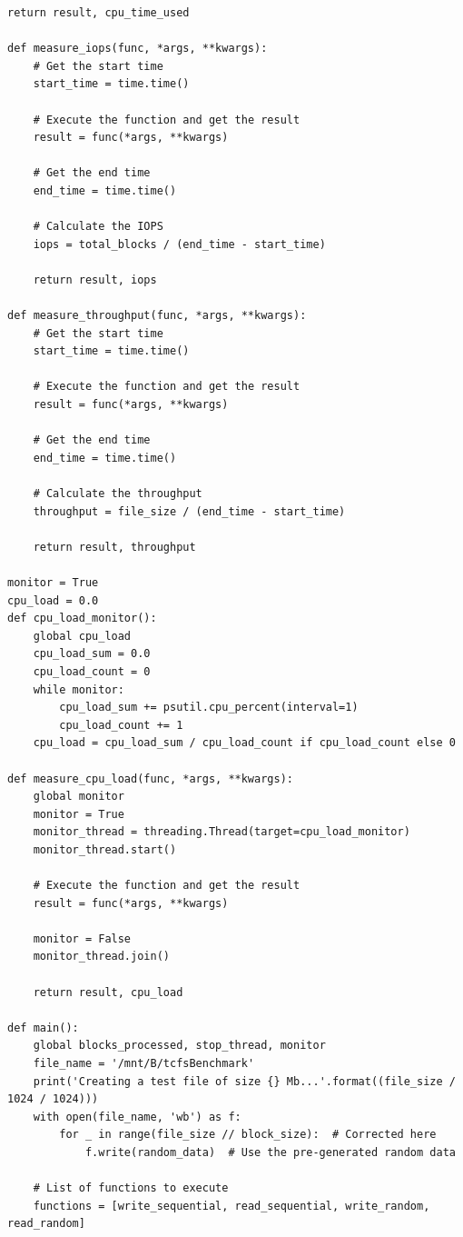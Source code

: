 \begin{lstlisting}[style=Python, caption=Script Python per il benchmarking, label=python-benchmark.py]
    return result, cpu_time_used

def measure_iops(func, *args, **kwargs):
    # Get the start time
    start_time = time.time()

    # Execute the function and get the result
    result = func(*args, **kwargs)

    # Get the end time
    end_time = time.time()

    # Calculate the IOPS
    iops = total_blocks / (end_time - start_time)

    return result, iops

def measure_throughput(func, *args, **kwargs):
    # Get the start time
    start_time = time.time()

    # Execute the function and get the result
    result = func(*args, **kwargs)

    # Get the end time
    end_time = time.time()

    # Calculate the throughput
    throughput = file_size / (end_time - start_time)

    return result, throughput

monitor = True
cpu_load = 0.0
def cpu_load_monitor():
    global cpu_load
    cpu_load_sum = 0.0
    cpu_load_count = 0
    while monitor:
        cpu_load_sum += psutil.cpu_percent(interval=1)
        cpu_load_count += 1
    cpu_load = cpu_load_sum / cpu_load_count if cpu_load_count else 0

def measure_cpu_load(func, *args, **kwargs):
    global monitor
    monitor = True
    monitor_thread = threading.Thread(target=cpu_load_monitor)
    monitor_thread.start()

    # Execute the function and get the result
    result = func(*args, **kwargs)

    monitor = False
    monitor_thread.join()

    return result, cpu_load

def main():
    global blocks_processed, stop_thread, monitor
    file_name = '/mnt/B/tcfsBenchmark'
    print('Creating a test file of size {} Mb...'.format((file_size / 1024 / 1024)))
    with open(file_name, 'wb') as f:
        for _ in range(file_size // block_size):  # Corrected here
            f.write(random_data)  # Use the pre-generated random data

    # List of functions to execute
    functions = [write_sequential, read_sequential, write_random, read_random]


\end{lstlisting}
